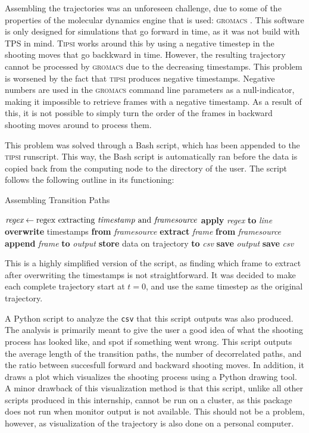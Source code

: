 \documentclass[]{article}
\begin{document}
Assembling the trajectories was an unforeseen challenge, due to some of the properties of the molecular dynamics engine that is used: \textsc{gromacs} \cite{gromacs}. This software is only designed for simulations that go forward in time, as it was not build with TPS in mind. \textsc{Tipsi} works around this by using a negative timestep in the shooting moves that go backkward in time. However, the resulting trajectory cannot be processed by \textsc{gromacs} due to the decreasing timestamps. This problem is worsened by the fact that \textsc{tipsi} produces negative timestamps. Negative numbers are used in the \textsc{gromacs} command line parameters as a null-indicator, making it impossible to retrieve frames with a negative timestamp. As a result of this, it is not possible to simply turn the order of the frames in backward shooting moves around to process them.  

This problem was solved through a Bash script, which has been appended to the \textsc{tipsi} runscript. This way, the Bash script is automatically ran before the data is copied back from the computing node to the directory of the user. The script follows the following outline in its functioning:
%
\begin{algorithm}
\caption{Assembling Transition Paths}\label{euclid}
\begin{algorithmic}[1]
\State $\textit{regex} \gets \text{regex extracting \textit{timestamp} and \textit{framesource}}$
\State \textbf{apply} \textit{regex} \textbf{to} \textit{line}
\State \textbf{overwrite} timestamps \textbf{from} \textit{framesource}
\State \textbf{extract} \textit{frame} \textbf{from} \textit{framesource}
\State \textbf{append} \textit{frame} \textbf{to} \textit{output}
\EndFor
\State \textbf{store} data on trajectory \textbf{to} \textit{csv}
\State \textbf{save} \textit{output}
\EndFor
\State \textbf{save} \textit{csv}
\end{algorithmic}
\end{algorithm}
%
This is a highly simplified version of the script, as finding which frame to extract after overwriting the timestamps is not straightforward. It was decided to make each complete trajectory start at $t=0$, and use the same timestep as the original trajectory.

A Python script to analyze the \texttt{csv} that this script outputs was also produced. The analysis is primarily meant to give the user a good idea of what the shooting process has looked like, and spot if something went wrong. This script outputs the average length of the transition paths, the number of decorrelated paths, and the ratio between succesfull forward and backward shooting moves. In addition, it draws a plot which visualizes the shooting process using a Python drawing tool. A minor drawback of this visualization method is that this script, unlike all other scripts produced in this internship, cannot be run on a cluster, as this package does not run when monitor output is not available. This should not be a problem, however, as visualization of the trajectory is also done on a personal computer.
\end{document}
